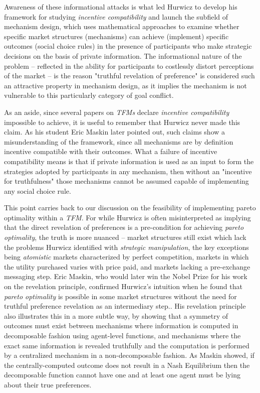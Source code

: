Awareness of these informational attacks is what led Hurwicz to develop his framework for studying \textit{incentive compatibility} and launch the subfield of mechanism design, which uses mathematical approaches to examine whether specific market structures (mechanisms) can achieve (implement) specific outcomes (social choice rules) in the presence of participants who make strategic decisions on the basis of private information. The informational nature of the problem -- reflected in the ability for participants to costlessly distort perceptions of the market -- is the reason "truthful revelation of preference" is considered such an attractive property in mechanism design, as it implies the mechanism is not vulnerable to this particularly category of goal conflict.

As an aside, since several papers on \textit{TFMs} declare \textit{incentive compatibility} impossible to achieve, it is useful to remember that Hurwicz never made this claim. As his student Eric Maskin later pointed out, such claims show a misunderstanding of the framework, since all mechanisms are by definition incentive compatible with their outcomes. What a failure of incentive compatibility means is that if private information is used as an input to form the strategies adopted by participants in any mechanism, then without an "incentive for truthfulness" those mechanisms cannot be assumed capable of implementing any social choice rule.

This point carries back to our discussion on the feasibility of implementing {pareto optimality} within a \textit{TFM}. For while Hurwicz is often misinterpreted as implying that the direct revelation of preferences is a pre-condition for achieving \textit{pareto optimality}, the truth is more nuanced -- market structures still exist which lack the problems Hurwicz identified with \textit{strategic manipulation}, the key exceptions being \textit{atomistic} markets characterized by perfect competition, markets in which the utility purchased varies with price paid, and markets lacking a pre-exchange messaging step. Eric Maskin, who would later win the Nobel Prize for his work on the revelation principle, confirmed Hurwicz's intuition when he found that \textit{pareto optimality} is possible in some market structures without the need for truthful preference revelation as an intermediary step.\citet{maskin1999nash}. His revelation principle also illustrates this in a more subtle way, by showing that a symmetry of outcomes must exist between mechanisms where information is computed in decomposable fashion using agent-level functions, and mechanisms where the exact same information is revealed truthfully and the computation is performed by a centralized mechanism in a non-decomposable fashion. As Maskin showed, if the centrally-computed outcome does not result in a Nash Equilibrium then the decomposable function cannot have one and at least one agent must be lying about their true preferences.

